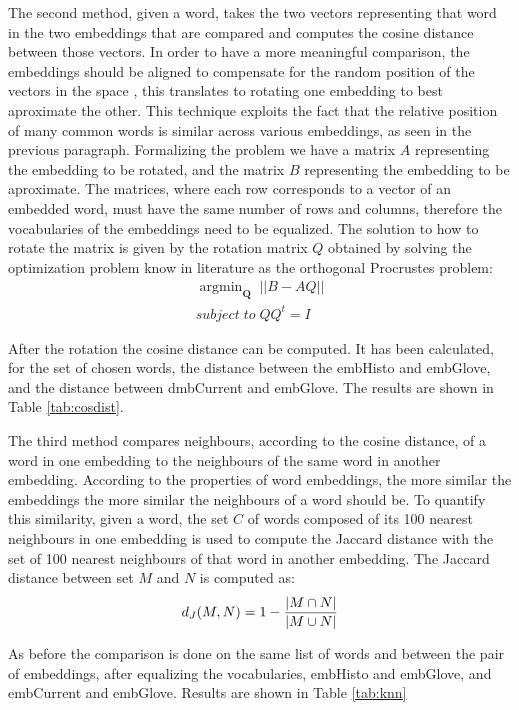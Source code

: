 \documentclass[runningheads]{llncs}
\begin{document}
The second method, given a word, takes the two vectors representing that word in the two embeddings that are compared and computes the cosine distance between those vectors. In order to have a more meaningful comparison, the embeddings should be aligned to compensate for the random position of the vectors in the space \cite{embcomp}, this translates to rotating one embedding to best aproximate the other. This technique exploits the fact that the relative position of many common words is similar across various embeddings, as seen in the previous paragraph. Formalizing the problem we have a matrix $A$ representing the embedding to be rotated, and the matrix $B$ representing the embedding to be aproximate. The matrices, where each row corresponds to a vector of an embedded word, must have the same number of rows and columns, therefore the vocabularies of the embeddings need to be equalized. The solution to how to rotate the matrix is given by the rotation matrix $Q$ obtained by solving the optimization problem know in literature as the orthogonal Procrustes problem:
\begin{align*}
\mathop{argmin}_{\textbf{Q}}\; ||B - AQ|| \\
subject\; to\; QQ^t = I
\end{align*}

After the rotation the cosine distance can be computed. It has been calculated, for the set of chosen words, the distance between the embHisto and embGlove, and the distance between dmbCurrent and embGlove. The results are shown in Table \ref{tab:cosdist}.

The third method compares neighbours, according to the cosine distance, of a word in one embedding to the neighbours of the same word in another embedding. According to the properties of word embeddings, the more similar the embeddings the more similar the neighbours of a word should be. To quantify this similarity, given a word, the set $C$ of words composed of its 100 nearest neighbours in one embedding is used to compute the Jaccard distance with the set of 100 nearest neighbours of that word in another embedding. The Jaccard distance between set $M$ and $N$ is computed as:
\begin{align*}
d_J(M,N) = 1 - { |M \cap N| \over |M \cup N| }
\end{align*}

As before the comparison is done on the same list of words and between the pair of embeddings, after equalizing the vocabularies, embHisto and embGlove, and embCurrent and embGlove. Results are shown in Table \ref{tab:knn}
\end{document}
